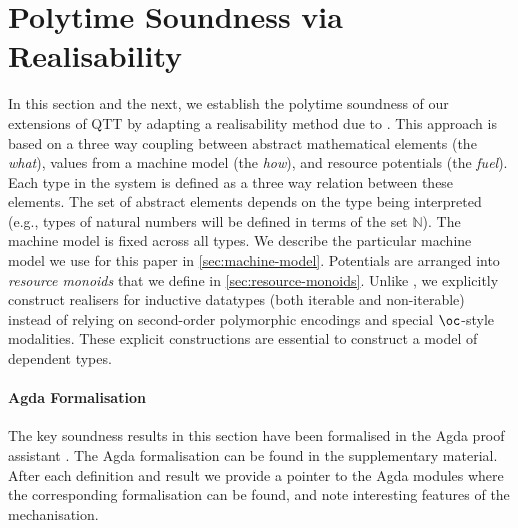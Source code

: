 \documentclass[acmsmall,screen]{acmart}
\begin{document}
\section{Polytime Soundness via Realisability}
\label{sec:soundness}

\newcommand{\cstaccess}{1}
\newcommand{\cstmkclo}{1}
\newcommand{\cstapp}{1}
\newcommand{\cstmkpair}{1}
\newcommand{\cstmkunit}{1}
\newcommand{\cstTrue}{1}
\newcommand{\cstFalse}{1}
\newcommand{\cstLetpair}{1}
\newcommand{\cstSeq}{1}
\newcommand{\cstIf}{1}

\newcommand{\clo}[2]{\mathsf{clo}\langle #1 , #2 \rangle}
\newcommand{\synTrue}{\mathsf{true}}
\newcommand{\synFalse}{\mathsf{false}}

\newcommand{\ExpSet}{\mathcal{E}}
\newcommand{\ValSet}{\mathcal{V}}

\newcommand{\rplus}{\oplus}
\newcommand{\rzero}{\emptyset}

In this section and the next, we establish the polytime soundness of
our extensions of QTT by adapting a realisability method due to
\citet{dallago11realisability}. This approach is based on a three way
coupling between abstract mathematical elements (the \emph{what}),
values from a machine model (the \emph{how}), and resource potentials
(the \emph{fuel}). Each type in the system is defined as a three way
relation between these elements. The set of abstract elements depends
on the type being interpreted (e.g., types of natural numbers will be
defined in terms of the set $\mathbb{N}$). The machine model is fixed
across all types. We describe the particular machine model we use for
this paper in \autoref{sec:machine-model}. Potentials are arranged
into \emph{resource monoids} that we define in
\autoref{sec:resource-monoids}. Unlike \citet{dallago11realisability},
we explicitly construct realisers for inductive datatypes (both
iterable and non-iterable) instead of relying on second-order
polymorphic encodings and special $\oc$-style modalities. These
explicit constructions are essential to construct a model of dependent
types.

\paragraph{Agda Formalisation} The key soundness results in this
section have been formalised in the Agda proof assistant
\cite{norell2008dependently}. The Agda formalisation can be found in
the supplementary material. After each definition and result we
provide a pointer to the Agda modules where the corresponding
formalisation can be found, and note interesting features of the
mechanisation.
\end{document}
